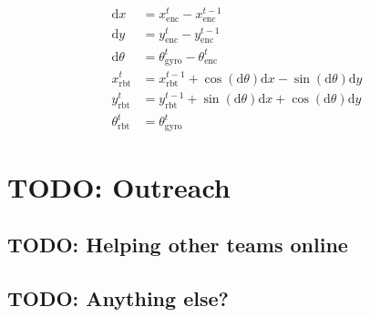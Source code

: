 \documentclass{article}
\begin{document}
\begin{center}
	\begin{align*}
		\mathrm{d}x&=x^{t}_{\mathrm{enc}}-x^{t-1}_{\mathrm{enc}} \\
		\mathrm{d}y&=y^{t}_{\mathrm{enc}}-y^{t-1}_{\mathrm{enc}} \\
		\mathrm{d}\theta&=\theta^t_{\mathrm{gyro}}-\theta^{t}_{\mathrm{enc}} \\
		x^t_{\mathrm{rbt}}&=x^{t-1}_{\mathrm{rbt}}+\cos(\mathrm{d}\theta)\mathrm{d}x-\sin(\mathrm{d}\theta)\mathrm{d}y \\
		y^t_{\mathrm{rbt}}&=y^{t-1}_{\mathrm{rbt}}+\sin(\mathrm{d}\theta)\mathrm{d}x+\cos(\mathrm{d}\theta)\mathrm{d}y \\
		\theta^t_{\mathrm{rbt}}&=\theta^t_{\mathrm{gyro}}
	\end{align*}
\end{center}

\newpage \section{TODO: Outreach}
\subsection{TODO: Helping other teams online}
\subsection{TODO: Anything else?}
\end{document}
